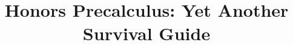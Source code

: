 \documentclass[12pt]{scrreprt}
\begin{document}
\title{Honors Precalculus: Yet Another Survival Guide}
\maketitle

\tableofcontents















\appendix{}


\end{document}
